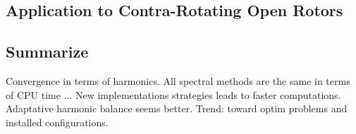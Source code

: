 

\subsection{Application to Contra-Rotating Open Rotors} %
\label{sub:application_to_contra_rotating_open_rotors}


\subsection{Summarize} %
\label{sub:summarize}

Convergence in terms of harmonics.
All spectral methods are the same in terms of CPU time ...
New implementations strategies leads to faster computations.
Adaptative harmonic balance seems better.
Trend: toward optim problems and installed configurations.

